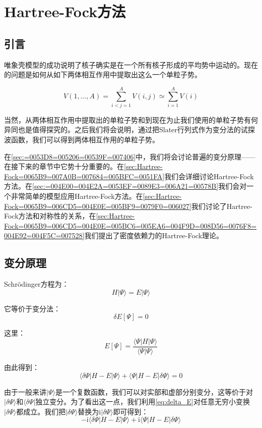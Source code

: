 
\chapter{Hartree-Fock方法\label{chap:Hartree-Fock=0065B9=006CD5}}

\section{引言}

唯象壳模型的成功说明了核子确实是在一个所有核子形成的平均势中运动的。现在的问题是如何从如下两体相互作用中提取出这么一个单粒子势。

\[
V(1,\dots,A)=\sum^{A}_{i<j=1}V(i,j)\simeq\sum^{A}_{i=1}V(i)
\]

当然，从两体相互作用中提取出的单粒子势和到现在为止我们使用的单粒子势有何异同也是值得探究的。之后我们将会说明，通过把Slater行列式作为变分法的试探波函数，我们可以得到两体相互作用的单粒子势。

在\ref{sec:=0053D8=005206=00539F=007406}中，我们将会讨论普遍的变分原理——在接下来的章节中它势十分重要的。在\ref{sec:Hartree-Fock=0065B9=007A0B=007684=005BFC=0051FA}我们会详细讨论Hartree-Fock方法。在\ref{sec:=004E00=004E2A=0053EF=0089E3=006A21=00578B}我们会对一个非常简单的模型应用Hartree-Fock方法。在\ref{sec:Hartree-Fock=0065B9=006CD5=004E0E=005BF9=0079F0=006027}我们讨论了Hartree-Fock方法和对称性的关系，在\ref{sec:Hartree-Fock=0065B9=006CD5=004E0E=005BC6=005EA6=004F9D=008D56=0076F8=004E92=004F5C=007528}我们提出了密度依赖力的Hartree-Fock理论。

\section{变分原理\label{sec:=0053D8=005206=00539F=007406}}

Schrödinger方程为：
\begin{equation}
H|\Psi\rangle=E|\Psi\rangle\label{eq:schrodinger equation}
\end{equation}

它等价于变分法：
\[
\delta E[\Psi]=0
\]

这里：
\[
E[\Psi]=\frac{\langle\Psi|H|\Psi\rangle}{\langle\Psi|\Psi\rangle}
\]

由此得到：
\begin{equation}
\langle\delta\Psi|H-E|\Psi\rangle+\langle\Psi|H-E|\delta\Psi\rangle=0\label{eq:delta_E}
\end{equation}

由于一般来讲$|\Psi\rangle$是一个复数函数，我们可以对实部和虚部分别变分，这等价于对$|\delta\Psi\rangle$和$\langle\delta\Psi|$独立变分。为了看出这一点，我们利用\ref{eq:delta_E}对任意无穷小变换$|\delta\Psi\rangle$都成立。我们把$|\delta\Psi\rangle$替换为$\mathrm{i}|\delta\Psi\rangle$即可得到：
\[
-\mathrm{i}\langle\delta\Psi|H-E|\Psi\rangle+\mathrm{i}\langle\Psi|H-E|\delta\Psi\rangle
\]

